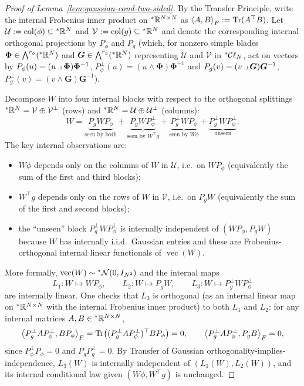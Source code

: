 \begin{proof}[Proof of Lemma~\ref{lem:gaussian-cond-two-sided}]
By the Transfer Principle, write the internal Frobenius inner product on ${}^*\mathbb{R}^{N \times N}$ as $\left\langle A, B \right\rangle_F := \operatorname{Tr}(A^\top B)$. Let $\mathcal{U} := \operatorname{col}(\phi) \subseteq {}^*\mathbb{R}^N$ and $\mathcal{V} := \operatorname{col}(g) \subseteq {}^*\mathbb{R}^N$ and denote the corresponding internal orthogonal projections by $P_\phi$ and $P_g$ (which, for nonzero simple blades $\bm{\Phi} \in \bigwedge^{r_\phi}({}^*\mathbb{R}^N)$ and $\bm{G} \in \bigwedge^{r_g}({}^*\mathbb{R}^N)$ representing $\mathcal{U}$ and $\mathcal{V}$ in ${}^*\mathcal{C}\ell_N$, act on vectors by $P_\phi(u) = (u\mathbin{\lrcorner}\bm{\Phi})\bm{\Phi}^{-1}$, $P_\phi^\perp(u) = (u\wedge\bm{\Phi})\bm{\Phi}^{-1}$ and $P_g(v) = (v\mathbin{\lrcorner}\bm{G})\bm{G}^{-1}$, $P_g^\perp(v) = (v\wedge\bm{G})\bm{G}^{-1}$).

Decompose $W$ into four internal blocks with respect to the orthogonal splittings ${}^*\mathbb{R}^N = \mathcal{V} \oplus \mathcal{V}^\perp$ (rows) and ${}^*\mathbb{R}^N = \mathcal{U} \oplus \mathcal{U}^\perp$ (columns):
\begin{equation}
\label{eq:appa-four-blocks}
W = \underbrace{P_g W P_\phi}_{\text{seen by both}}
    + \underbrace{P_g W P_\phi^\perp}_{\text{seen by } W^\top g}
    + \underbrace{P_g^\perp W P_\phi}_{\text{seen by } W\phi}
    + \underbrace{P_g^\perp W P_\phi^\perp}_{\text{unseen}}.
\end{equation}
The key internal observations are:
\begin{itemize}
  \item $W\phi$ depends only on the columns of $W$ in $\mathcal{U}$, i.e.\ on $W P_\phi$ (equivalently the sum of the first and third blocks);
  \item $W^\top g$ depends only on the rows of $W$ in $\mathcal{V}$, i.e.\ on $P_g W$ (equivalently the sum of the first and second blocks);
  \item the ``unseen'' block $P_g^\perp W P_\phi^\perp$ is internally independent of $(W P_\phi, P_g W)$ because $W$ has internally i.i.d.\ Gaussian entries and these are Frobenius-orthogonal internal linear functionals of $\operatorname{vec}(W)$.
\end{itemize}
More formally, $\operatorname{vec}(W) \sim {}^*\mathcal{N}(0, I_{N^2})$ and the internal maps
\begin{equation}
\label{eq:appa-linear-maps}
L_1 : W \mapsto W P_\phi, \qquad
L_2 : W \mapsto P_g W, \qquad
L_3 : W \mapsto P_g^\perp W P_\phi^\perp
\end{equation}
are internally linear. One checks that $L_3$ is orthogonal (as an internal linear map on ${}^*\mathbb{R}^{N \times N}$ with the internal Frobenius inner product) to both $L_1$ and $L_2$: for any internal matrices $A, B \in {}^*\mathbb{R}^{N \times N}$,
\begin{equation}
\label{eq:appa-frob-orthog}
\left\langle P_g^\perp A P_\phi^\perp, B P_\phi \right\rangle_F = \operatorname{Tr}\bigl((P_g^\perp A P_\phi^\perp)^\top B P_\phi\bigr) = 0, \qquad
\left\langle P_g^\perp A P_\phi^\perp, P_g B \right\rangle_F = 0,
\end{equation}
since $P_\phi^\perp P_\phi = 0$ and $P_g P_g^\perp = 0$. By Transfer of Gaussian orthogonality-implies-independence, $L_3(W)$ is internally independent of $(L_1(W), L_2(W))$, and its internal conditional law given $(W\phi, W^\top g)$ is unchanged.


\end{proof}
